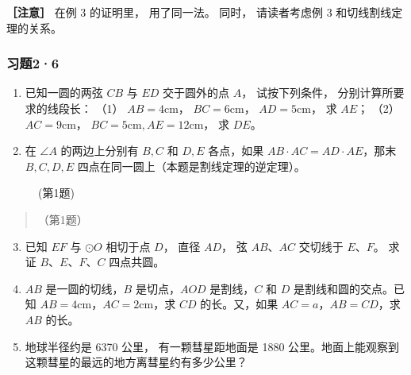 \textbf{［注意］} 在例 3 的证明里， 用了同一法。 同时， 请读者考虑例 3
和切线割线定理的关系。

\subsubsection{习题2·6}

\begin{enumerate}
\item
  已知一圆的两弦 \(CB\) 与 \(ED\) 交于圆外的点 \(A\)， 试按下列条件，
  分别计算所要求的线段长： （1） \(AB = 4\mathrm{cm}\)，
  \(BC = 6\mathrm{cm}\)， \(AD = 5\mathrm{cm}\)， 求 \(AE\)； （2）
  \(AC = 9\mathrm{cm}\)， \(BC = 5\mathrm{cm}, AE = 12\mathrm{cm}\)， 求
  \(DE\)。
\item
  在 \(\angle A\) 的两边上分别有 \(B, C\) 和 \(D, E\) 各点，如果
  \(AB \cdot AC = AD \cdot AE\)，那末 \(B, C, D, E\)
  四点在同一圆上（本题是割线定理的逆定理）。
\end{enumerate}

\begin{figure}
\centering
{}
\caption{(第1题)}
\end{figure}

\begin{quote}
（第1题）
\end{quote}

\begin{enumerate}
\setcounter{enumi}{2}
\item
  已知 \(EF\) 与 \(\odot O\) 相切于点 \(D\)， 直径 \(AD\)， 弦
  \(AB\)、\(AC\) 交切线于 \(E\)、\(F\)。 求证 \(B\)、\(E\)、\(F\)、\(C\)
  四点共圆。
\item
  \(AB\) 是一圆的切线，\(B\) 是切点，\(AOD\) 是割线，\(C\) 和 \(D\)
  是割线和圆的交点。已知
  \(AB = 4\mathrm{cm}\)，\(AC = 2\mathrm{cm}\)，求 \(CD\) 的长。又，如果
  \(AC = a\)，\(AB = CD\)，求 \(AB\) 的长。
\item
  地球半径约是 6370 公里， 有一颗彗星距地面是 1880
  公里。地面上能观察到这颗彗星的最远的地方离彗星约有多少公里？
\end{enumerate}

